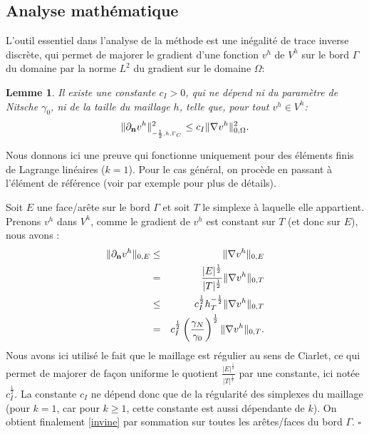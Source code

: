 \documentclass[11pt]{book}
\newtheorem{lemma}[theorem]{Lemme}
\newcommand{\beq}{\begin{eqnarray}}
\newcommand{\eeq}{\end{eqnarray}}
\newcommand{\bl}{\begin{lemma}}
\newcommand{\el}{\end{lemma}}
\newcommand{\cqfd}{{$\mbox{}$\hfill$\square$}}
\def\n{{\bf n}}
\def\vv{{\bf v}}
\newcommand{\Gc}{\Gamma_{C}}
\newcommand{\sn}{{\sigma_n}}
\newcommand{\dnv}{\partial_{\n} v}
\newcommand{\nngc}[1]{\|{#1}\|_{_{-\frac12,h,\Gc}}}
\begin{document}
\subsection{Analyse mathématique}

L'outil essentiel dans l'analyse de la méthode est une inégalité de trace inverse discrète, qui permet de majorer le gradient d'une fonction $v^h$ de $V^h$ sur le bord $\Gamma$ du domaine par la norme $L^2$ du gradient sur le domaine $\Omega$:
\bl
\label{lemma:elliptic}
Il existe une constante $c_I > 0$, qui ne dépend ni du paramètre de Nitsche $\gamma_0$, ni de la taille du maillage $h$, telle que, pour tout $v^h \in V^h$:
\beq \label{invine}
\nngc{\dnv^h}^2
\le c_I \Vert \nabla v^h \Vert^2_{0,\Omega}.
\eeq
\el

\proof Nous donnons ici une preuve qui fonctionne uniquement pour des éléments finis de Lagrange linéaires ($k=1$). Pour le cas général, on procède en passant à l'élément de référence (voir par exemple \cite[Lemma 2.1]{thomee-97} pour plus de détails).

Soit $E$ une face/arête sur le bord $\Gamma$ et soit $T$ le simplexe à laquelle elle appartient. Prenons $v^h$ dans $V^h$, comme le gradient de $v^h$ est constant sur $T$ (et donc sur $E$), nous avons :
  \beq
   \Vert \dnv^h \Vert_{0,E} & \leq &  \Vert \nabla v^h \Vert_{0,E}
   \nonumber \\
   &=& \frac{\vert E \vert^{\frac{1}{2}}}{\vert T \vert^{\frac{1}{2}}} 
   \Vert \nabla v^h \Vert_{0,T} \nonumber \\
   &\le& c_I^{\frac12}  h_T^{-{\frac12}} \Vert \nabla v^h \Vert_{0,T}\nonumber \\
   &=& c_I^{\frac12} \left(\frac{\gamma_N}{\gamma_0} \right)^{{\frac12}} \Vert \nabla v^h \Vert_{0,T}.\nonumber
  \eeq
Nous avons ici utilisé le fait que le maillage est régulier au sens de Ciarlet, ce qui permet de majorer de façon uniforme le quotient $\frac{\vert E \vert^{\frac{1}{2}}}{\vert T \vert^{\frac{1}{2}}}$ par une constante, ici notée $c_I^{\frac12}$. La constante $c_I$ ne dépend donc que de la régularité des simplexes du maillage (pour $k=1$, car pour $k\geq1$, cette constante est aussi dépendante de $k$).  
On obtient finalement \eqref{invine} par sommation sur toutes les arêtes/faces du bord $\Gamma$.
\cqfd
\end{document}
